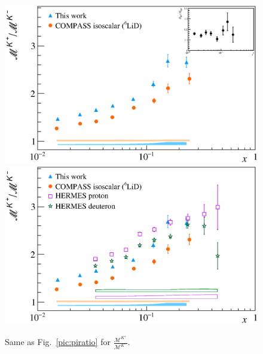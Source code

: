 \begin{figure}[!h]
  \centering
	\includegraphics[scale=0.5]{./gfx/Mult_k_ratio_noH.eps}
	\includegraphics[scale=0.5]{./gfx/Mult_k_ratio.eps}
	\caption{Same as Fig.~\ref{pic:piratio} for $\frac{\mathscr{M}^{K^+}}{\mathscr{M}^{K^-}}$.}
	\label{pic:kratio}
\end{figure}


